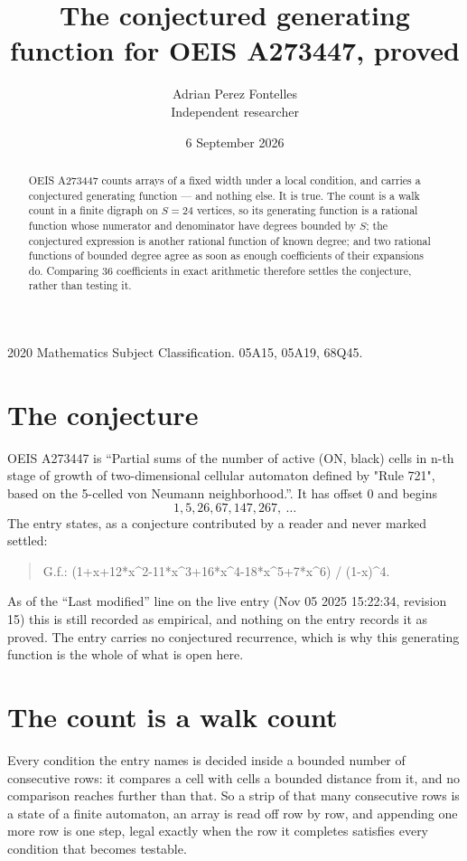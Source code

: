\documentclass[11pt,a4paper]{article}
\title{The conjectured generating function for OEIS A273447, proved}
\author{Adrian Perez Fontelles\\ \small Independent researcher}
\date{6 September 2026}
\theoremstyle{plain}
\theoremstyle{definition}
\begin{document}
\maketitle

\begin{abstract}
OEIS A273447 counts arrays of a fixed width under a local condition, and carries a conjectured
generating function --- and nothing else. It is true. The count is a walk count in a finite
digraph on $S=24$ vertices, so its generating function is a rational function whose numerator
and denominator have degrees bounded by $S$; the conjectured expression is another rational
function of known degree; and two rational functions of bounded degree agree as soon as enough
coefficients of their expansions do. Comparing $36$ coefficients in exact arithmetic
therefore settles the conjecture, rather than testing it.
\end{abstract}

\noindent\small 2020 Mathematics Subject Classification. 05A15, 05A19, 68Q45.\normalsize

\section{The conjecture}

OEIS A273447 is ``Partial sums of the number of active (ON, black) cells in n-th stage of growth of two-dimensional cellular automaton defined by "Rule 721", based on the 5-celled von Neumann neighborhood.''. It has offset $0$ and begins
\[
1, 5, 26, 67, 147, 267,\ \dots
\]
The entry states, as a conjecture contributed by a reader and never marked settled:
\begin{quote}
G.f.: (1+x+12*x\^{}2-11*x\^{}3+16*x\^{}4-18*x\^{}5+7*x\^{}6) / (1-x)\^{}4.
\end{quote}
As of the ``Last modified'' line on the live entry (Nov 05 2025 15:22:34, revision 15) this is still
recorded as empirical, and nothing on the entry records it as proved. The entry carries no
conjectured recurrence, which is why this generating function is the whole of what is open
here.

\section{The count is a walk count}

Every condition the entry names is decided inside a bounded number of consecutive rows: it
compares a cell with cells a bounded distance from it, and no comparison reaches further than
that. So a strip of that many consecutive rows is a state of a finite automaton, an array is
read off row by row, and appending one more row is one step, legal exactly when the row it
completes satisfies every condition that becomes testable.
\end{document}
